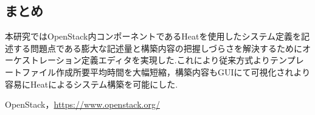 \documentclass[a4j]{jarticle}
\begin{document}
\begin{Abstract}
 \section{まとめ}
 本研究ではOpenStack内コンポーネントであるHeatを使用したシステム定義を記述する問題点である膨大な記述量と構築内容の把握しづらさを解決するためにオーケストレーション定義エディタを実現した.これにより従来方式よりテンプレートファイル作成所要平均時間を大幅短縮，構築内容もGUIにて可視化されより容易にHeatによるシステム構築を可能にした.
 
\begin{thebibliography}{99}
  OpenStack，\url{https://www.openstack.org/}
\end{thebibliography}

\end{Abstract}
\end{document}
